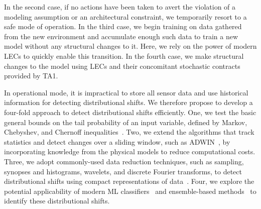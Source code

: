 In the second case, if no actions have been taken to avert the violation of a modeling assumption or an architectural constraint, we temporarily resort to a safe mode of operation. In the third case, we begin training on data gathered from the new environment and accumulate enough such data to train a new model without any structural changes to it. Here, we rely on the power of modern LECs to quickly enable this transition. In the fourth case, we make structural changes to the model using LECs and their concomitant stochastic contracts provided by TA1.

In operational mode, it is impractical to store all sensor data and use historical information for detecting distributional shifts. We therefore propose to develop a four-fold approach to detect distributional shifts efficiently. One, we test the basic general bounds on the tail probability of an input variable, defined by Markov, Chebyshev, and Chernoff inequalities~\cite{gama2010knowledge}. Two, we extend the algorithms that track statistics and detect changes over a sliding window, such as ADWIN~\cite{bifet2007learning}, by incorporating knowledge from the physical models to reduce computational costs. Three, we adopt commonly-used data reduction techniques, such as sampling, synopses and histograms, wavelets, and discrete Fourier transforms, to detect distributional shifts using compact representations of data~\cite{chan1999efficient,witten2016data}. Four, we explore the potential applicability of modern ML classifiers~\cite{quionero2009dataset} and ensemble-based methods~\cite{Wang:2003:MCD:956750.956778} to identify these distributional shifts.


